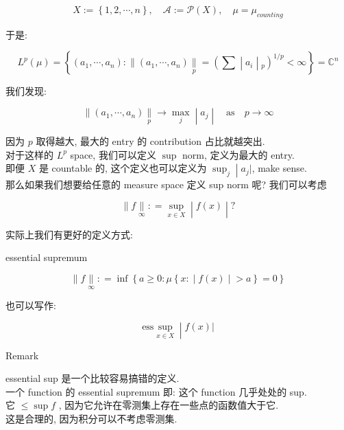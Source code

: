 \documentclass{qlnotes-export}
\begin{document}
\[X := \left\{ {1,2,\cdots,n} \right\},\quad\mathcal{A} := \mathcal{P}(X),\quad\mu = \mu_{counting}\]

于是:

\[L^{p}(\mu) = \left\{ (a_{1},\cdots,a_{n}): \parallel (a_{1},\cdots,a_{n})\underset{p}{\parallel} = (\sum \middle| a_{i} \middle| {}_{p})^{1/p} < \infty \right\} = {\mathbb{C}}^{n}\]

我们发现:

\[\left. \parallel (a_{1},\cdots,a_{n})\underset{p}{\parallel}\rightarrow\max\limits_{j} \middle| a_{j} \middle| \quad\text{as}\quad p\rightarrow\infty \right.\]

因为 \(p\) 取得越大, 最大的 entry 的 contribution 占比就越突出.\\
对于这样的 \(L^{p}\) space, 我们可以定义 \(\sup\) norm, 定义为最大的 entry.\\
即便 \(X\) 是 countable 的, 这个定义也可以定义为 \(\left. \sup_{j} \middle| a_{j}| \right.\), make sense.\\
那么如果我们想要给任意的 measure space 定义 sup norm 呢? 我们可以考虑

\[\left. \parallel f\underset{\infty}{\parallel}: = \sup\limits_{x \in X} \middle| f(x) \middle| ? \right.\]

实际上我们有更好的定义方式:

\begin{definition}{essential supremum}\label{def-09-l-p-space-and-inequalities-essential-supremum}

\[\parallel f\underset{\infty}{\parallel}: = \inf\left\{ {a \geq 0:\mu\left\{ x: \middle| f(x) \middle| > a \right\} = 0} \right\}\]

也可以写作:

\[\left. \text{ess}\sup\limits_{x \in X} \middle| f(x)| \right.\]

\end{definition}

\begin{qlremark}{Remark}

essential sup 是一个比较容易搞错的定义.\\
一个 function 的 essential supremum 即: 这个 function 几乎处处的 sup.\\
它 \(\leq \sup f\) , 因为它允许在零测集上存在一些点的函数值大于它.\\
这是合理的, 因为积分可以不考虑零测集.\\

\end{qlremark}
\end{document}
